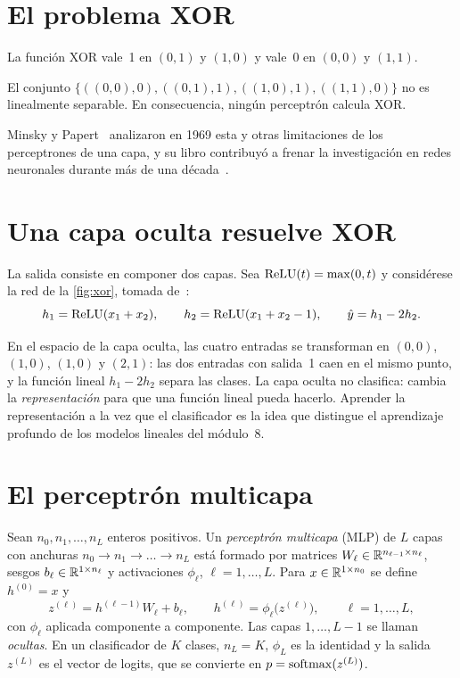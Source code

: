 \section{El problema XOR}

La función XOR vale~1 en $(0,1)$ y $(1,0)$ y vale~0 en $(0,0)$ y $(1,1)$.

\begin{proposicion}\label{prop:xor}
El conjunto $\{((0,0),0),((0,1),1),((1,0),1),((1,1),0)\}$ no es linealmente separable. En consecuencia, ningún perceptrón calcula XOR.
\end{proposicion}

Minsky y Papert~\cite{minsky} analizaron en 1969 esta y otras limitaciones de los perceptrones de una capa, y su libro contribuyó a frenar la investigación en redes neuronales durante más de una década~\cite[cap.~1]{gbc}.

\section{Una capa oculta resuelve XOR}

La salida consiste en componer dos capas. Sea $\operatorname{ReLU}(t)=\max(0,t)$ y considérese la red de la \cref{fig:xor}, tomada de~\cite[§6.1]{gbc}:
\begin{equation}\label{eq:xor}
h_1=\operatorname{ReLU}(x_1+x_2),\qquad h_2=\operatorname{ReLU}(x_1+x_2-1),\qquad \hat y=h_1-2h_2.
\end{equation}

\addtocounter{figure}{1}%

En el espacio de la capa oculta, las cuatro entradas se transforman en $(0,0)$, $(1,0)$, $(1,0)$ y $(2,1)$: las dos entradas con salida~1 caen en el mismo punto, y la función lineal $h_1-2h_2$ separa las clases. La capa oculta no clasifica: cambia la \emph{representación} para que una función lineal pueda hacerlo. Aprender la representación a la vez que el clasificador es la idea que distingue el aprendizaje profundo de los modelos lineales del módulo~8.

\section{El perceptrón multicapa}

\begin{definicion}\label{def:mlp}
Sean $n_0,n_1,\dots,n_L$ enteros positivos. Un \emph{perceptrón multicapa} (MLP) de $L$ capas con anchuras $n_0\to n_1\to\dots\to n_L$ está formado por matrices $W_\ell\in\mathbb{R}^{n_{\ell-1}\times n_\ell}$, sesgos $b_\ell\in\mathbb{R}^{1\times n_\ell}$ y activaciones $\phi_\ell$, $\ell=1,\dots,L$. Para $x\in\mathbb{R}^{1\times n_0}$ se define $h^{(0)}=x$ y
\[
z^{(\ell)}=h^{(\ell-1)}W_\ell+b_\ell,\qquad h^{(\ell)}=\phi_\ell\bigl(z^{(\ell)}\bigr),\qquad \ell=1,\dots,L,
\]
con $\phi_\ell$ aplicada componente a componente. Las capas $1,\dots,L-1$ se llaman \emph{ocultas}. En un clasificador de $K$ clases, $n_L=K$, $\phi_L$ es la identidad y la salida $z^{(L)}$ es el vector de logits, que se convierte en $p=\operatorname{softmax}(z^{(L)})$.
\end{definicion}

